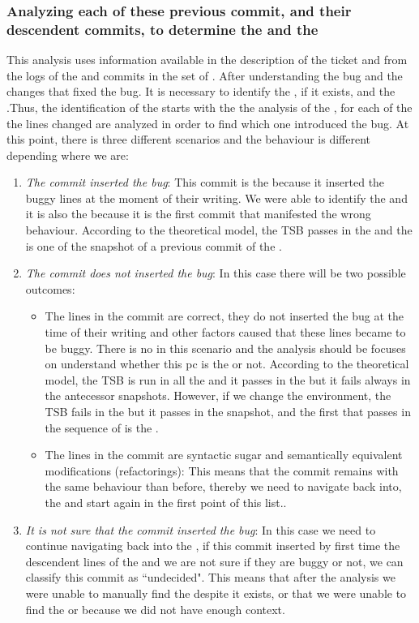 \documentclass[a4paper, 12pt]{book}
\begin{document}
\subsubsection{Analyzing each of these previous commit, and their descendent commits, to determine the \BIC and the \FFC}

This analysis uses information available in the description of the ticket and from the logs of the \BFC and commits in the set of . After understanding the bug and the changes that fixed the bug. It is necessary to identify the \BIC, if it exists, and the \FFC.Thus, the identification of the \BIC starts with the the analysis of the , for each of the  the lines changed are analyzed in order to find which one introduced the bug. At this point, there is three different scenarios and the behaviour is different depending where we are:
\begin{enumerate}
	\item \textit{The commit inserted the bug}: This commit is the \BIC because it inserted the buggy lines at the moment of their writing. We were able to identify the \BIC and it is also the \FFC because it is the first commit that manifested the wrong behaviour. According to the theoretical model, the TSB passes in the \BFC and the \BIS is one of the snapshot of a previous commit of the \BFC.
	\item \textit{The commit does not inserted the bug}: In this case there will be two possible outcomes:
		\begin{itemize}
			\item The lines in the commit are correct, they do not inserted the bug at the time of their writing and other factors caused that these lines became to be buggy. There is no \BIC in this scenario and the analysis should be focuses on understand whether this pc is the \FFC or not. According to the theoretical model, the TSB is run in all the  and it passes in the \BFC but it fails always in the antecessor snapshots. However, if we change the environment,  the TSB fails in the \BFC but it passes in the snapshot, and the first \BIS that passes in the sequence of \BIS is the \FFC.
			\item The lines in the commit are syntactic sugar and semantically equivalent modifications (refactorings): This means that the commit remains with the same behaviour than before, thereby we need to navigate back into, the  and start again in the first point of this list..
		\end{itemize}
	\item \textit{It is not sure that the commit inserted the bug}: In this case we need to continue navigating back into the , if this commit inserted by first time the descendent lines of the  and we are not sure if they are buggy or not, we can classify this commit as ``undecided". This means that after the analysis we were unable to manually find the \BIC despite it exists, or that we were unable to find the \FFC or \BIC because we did not have enough context.
\end{enumerate}
\end{document}
